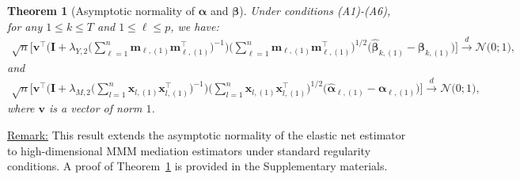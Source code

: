 \documentclass[
  12pt]{article}
\newtheorem{thm}{Theorem}[section]
\def\M{\mathbf{m}}
\def\X{\mathbf{x}}
\begin{document}
\begin{thm}[Asymptotic normality of $\bm{\alpha}$ and $\bm{\beta}$]\label{thm:asymptotic.normality.elastic.net.estimator:beta_k}
	Under conditions \textrm{(A1)-(A6)}, for any $1 \leq k \leq T$ and $1 \leq \ell \leq p$, we have:
	\begin{align*}
		\sqrt{n}  \Big[   \mathbf{v}^{\top}  \Big( \mathbf{I} + \lambda_{Y,2} \big(   \sum_{\ell = 1}^{n}   \M_{\ell , (1)} \M_{\ell , (1)}^{\top} \big)^{-1}  \Big)  \Big(  \sum_{\ell = 1}^{n}    \M_{\ell , (1)} \M_{\ell , (1)}^{\top} \Big)^{1/2} \Big( \widehat{\bm{\beta}}_{k,(1)} - \bm{\beta}_{k,(1)} \Big)   \Big]
		\overset{ d }{\longrightarrow} \mathcal{N} \big(0 ; 1 \big),
	\end{align*}
    \textrm{ and } \quad
    \begin{align*}
        \sqrt{n}  \Big[   \mathbf{v}^{\top}  \Big(\mathbf{I} + \lambda_{M,2} \big(   \sum_{l = 1}^{n}   \X_{l , (1)} \X_{l , (1)}^{\top} \big)^{-1}  \Big)  \Big(  \sum_{l = 1}^{n}    \X_{l , (1)} \X_{l , (1)}^{\top} \Big)^{1/2} \Big( \widehat{\bm{\alpha}}_{\ell,(1)} - \bm{\alpha}_{\ell,(1)} \Big)   \Big]
		\overset{ d }{\longrightarrow} \mathcal{N} \big( 0;1\big),
	\end{align*}
	where $\mathbf{v}$ is a vector of norm $1$.
\end{thm}

\noindent
\underline{Remark:} This result extends the asymptotic normality of the elastic net estimator to high-dimensional MMM mediation estimators under standard regularity conditions. A proof of Theorem~\ref{thm:asymptotic.normality.elastic.net.estimator:beta_k} is provided in the Supplementary materials.   %
\end{document}
